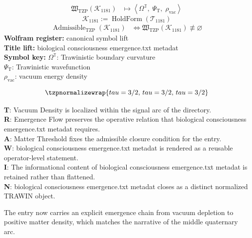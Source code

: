 \noindent
\begin{minipage}[t]{0.48\linewidth}
\begingroup
\small
\[
\begin{aligned}
\mathfrak{W}_{\mathrm{TZP}}\!\left(\mathcal{K}_{1181}\right)
&\longmapsto
\left\langle \Omega^{\mathbb{T}},\; \Psi_{\mathrm{T}},\; \rho_{\mathrm{vac}} \right\rangle
\end{aligned}
\]
\[
\mathcal{K}_{1181}
:=
\operatorname{HoldForm}\!\left(\mathcal{T}_{1181}\right)
\]
\[
\begin{aligned}
\operatorname{Admissible}_{\mathrm{TZP}}\!\left(\mathcal{K}_{1181}\right)
&\Longleftrightarrow
\mathfrak{W}_{\mathrm{TZP}}\!\left(\mathcal{K}_{1181}\right)\not\equiv\varnothing
\end{aligned}
\]
\textbf{Wolfram register:} canonical symbol lift\\
\textbf{Title lift:} biological consciousness emergence.txt metadat\\
\textbf{Symbol key:} \(\Omega^{\mathbb{T}}\): Trawinistic boundary curvature\\ \(\Psi_{\mathrm{T}}\): Trawinistic wavefunction\\ \(\rho_{\mathrm{vac}}\): vacuum energy density
\par
\endgroup
\end{minipage}\hfill
\begin{minipage}[t]{0.48\linewidth}
\[
\tzpnormalizewrap{tau = 3/2,\,tau = 3/2,\,tau = 3/2}
\]

\small
\textbf{T}: Vacuum Density is localized within the signal arc of the directory.\\
\textbf{R}: Emergence Flow preserves the operative relation that biological consciousness emergence.txt metadat requires.\\
\textbf{A}: Matter Threshold fixes the admissible closure condition for the entry.\\
\textbf{W}: biological consciousness emergence.txt metadat is rendered as a reusable operator-level statement.\\
\textbf{I}: The informational content of biological consciousness emergence.txt metadat is retained rather than flattened.\\
\textbf{N}: biological consciousness emergence.txt metadat closes as a distinct normalized TRAWIN object.
\normalsize
\end{minipage}

The entry now carries an explicit emergence chain from vacuum depletion to positive matter density, which matches the narrative of the middle quaternary arc.
\clearpage

